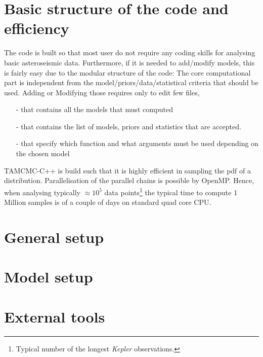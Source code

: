 \documentclass[10pt,a4paper]{article}
\begin{document}
\section{Basic structure of the code and efficiency}
The code is built so that most user do not require any coding skills for analysing basic asteroseismic data. Furthermore, if it is needed to add/modify models, this is fairly easy due to the modular structure of the code: The core computational part is independent from the model/priors/data/statistical criteria that should be used. Adding or Modifying those requires only to edit few files,
\begin{itemize}
	\item[-]  \textbf{}  that contains all the models that must computed
	\item[-] \textbf{ }   that contains the list of models, priors and statistics that are accepted.
	\item[-] \textbf{ } that specify which function and what arguments must be used depending on the chosen model
\end{itemize}

TAMCMC-C++ is build such that it is highly efficient in sampling the pdf of a distribution. Parallelisation of the parallel chains is possible by OpenMP. Hence, when analysing typically $\approx 10^5$ data points\footnote{Typical number of the longest {\it Kepler} observations.} the typical time to compute 1 Million samples is of a couple of days on standard quad core CPU.

\section{General setup}

\section{Model setup}

\section{External tools}



\end{document}
